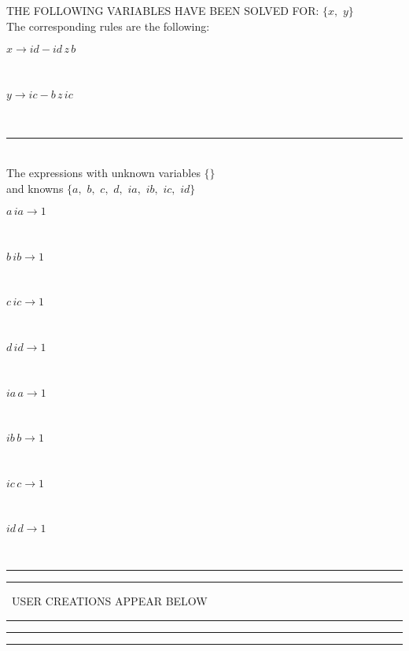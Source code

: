 \documentclass[rep10,leqno]{report}
\begin{document}
THE FOLLOWING VARIABLES HAVE BEEN SOLVED FOR:\hfil\break
$\{x,
$ $
y\}$
\smallskip\\
The corresponding rules are the following:\smallskip\\
\begin{minipage}{6in}
$
x\rightarrow id - id\,
 z\,
 b
$
\end{minipage}\medskip\\
\begin{minipage}{6in}
$
y\rightarrow ic - b\,
 z\,
 ic
$
\end{minipage}\medskip\\
\rule[3pt]{6in}{.7pt}\\
The expressions with unknown variables $\{\}$\\
and knowns $\{a,
$ $
b,
$ $
c,
$ $
d,
$ $
ia,
$ $
ib,
$ $
ic,
$ $
id\}$\smallskip\\
\begin{minipage}{6in}
$
a\,
 ia\rightarrow 1
$
\end{minipage}\medskip \\
\begin{minipage}{6in}
$
b\,
 ib\rightarrow 1
$
\end{minipage}\medskip \\
\begin{minipage}{6in}
$
c\,
 ic\rightarrow 1
$
\end{minipage}\medskip \\
\begin{minipage}{6in}
$
d\,
 id\rightarrow 1
$
\end{minipage}\medskip \\
\begin{minipage}{6in}
$
ia\,
 a\rightarrow 1
$
\end{minipage}\medskip \\
\begin{minipage}{6in}
$
ib\,
 b\rightarrow 1
$
\end{minipage}\medskip \\
\begin{minipage}{6in}
$
ic\,
 c\rightarrow 1
$
\end{minipage}\medskip \\
\begin{minipage}{6in}
$
id\,
 d\rightarrow 1
$
\end{minipage}\\
\rule[2pt]{6in}{1pt}\hfil\break
\rule[2.5pt]{1.701in}{1pt}
\ USER CREATIONS APPEAR BELOW\ 
\rule[2.5pt]{1.701in}{1pt}\hfil\break
\rule[2pt]{6in}{1pt}\hfil\break
\rule[2pt]{6in}{4pt}\hfil\break
\end{document}

